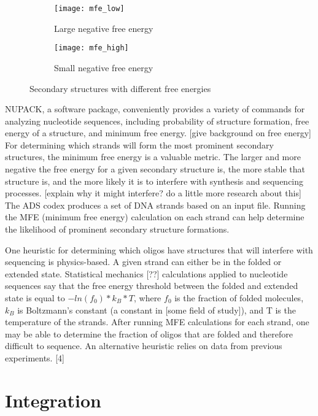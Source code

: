 \documentclass{article}
\begin{document}
\begin{figure}[!h]
\centering
\begin{subfigure}{.5\textwidth}
  \centering
  \texttt{[image: mfe\_low]}
  \caption{Large negative free energy}
  \label{fig:sub1}
\end{subfigure}%
\begin{subfigure}{.5\textwidth}
  \centering
  \texttt{[image: mfe\_high]}
  \caption{Small negative free energy}
  \label{fig:sub2}
\end{subfigure}
\caption{Secondary structures with different free energies}
\label{fig:test}
\end{figure}

NUPACK, a software package, conveniently provides a variety of commands for analyzing nucleotide sequences, including probability of structure formation, free energy of a structure, and minimum free energy. [give background on free energy] For determining which strands will form the most prominent secondary structures, the minimum free energy is a valuable metric. The larger and more negative the free energy for a given secondary structure is, the more stable that structure is, and the more likely it is to interfere with synthesis and sequencing processes. [explain why it might interfere? do a little more research about this] The ADS codex produces a set of DNA strands based on an input file. Running the MFE (minimum free energy) calculation on each strand can help determine the likelihood of prominent secondary structure formations.

One heuristic for determining which oligos have structures that will interfere with sequencing is physics-based. A given strand can either be in the folded or extended state. Statistical mechanics [??] calculations applied to nucleotide sequences say that the free energy threshold between the folded and extended state is equal to $-ln(f_0) * k_B * T$, where $f_0$ is the fraction of folded molecules, $k_B$ is Boltzmann’s constant (a constant in [some field of study]), and T is the temperature of the strands. After running MFE calculations for each strand, one may be able to determine the fraction of oligos that are folded and therefore difficult to sequence. An alternative heuristic relies on data from previous experiments. [4]

\section{Integration}
\end{document}
